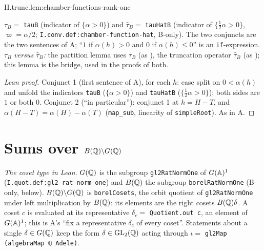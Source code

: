 \begin{lemma}
\end{lemma}
\begin{tfformal}{II.trunc.lem:chamber-functions-rank-one}
\begin{tffidelity}
$\tau_B=$ \texttt{tauB} (indicator of $\{\alpha>0\}$) and $\hat\tau_B=$ \texttt{tauHatB} (indicator of $\{\tfrac12\alpha>0\}$, $\varpi=\alpha/2$; \texttt{I.conv.def:chamber-function-hat}, B-only). The two conjuncts are the two sentences of A; ``$1$ if $\alpha(h)>0$ and $0$ if $\alpha(h)\le0$'' is an \texttt{if}-expression. \emph{$\tau_B$ versus $\hat\tau_B$:} the partition lemma uses $\tau_B$ (as \cite[Lemma~8.2]{AIntro}), the truncation operator $\hat\tau_B$ (as \cite[(13.1)]{AIntro}); this lemma is the bridge, used in the proofs of both.
\end{tffidelity}
\end{tfformal}
\begin{proof}[Lean proof]
Conjunct 1 (first sentence of A), for each $h$: case split on $0<\alpha(h)$ and unfold the indicators \texttt{tauB} ($\{\alpha>0\}$) and \texttt{tauHatB} ($\{\frac12\alpha>0\}$); both sides are $1$ or both $0$. Conjunct 2 (``in particular''): conjunct 1 at $h=H-T$, and $\alpha(H-T)=\alpha(H)-\alpha(T)$ (\texttt{map\_sub}, linearity of \texttt{simpleRoot}). As in A.
\end{proof}


\section{Sums over \texorpdfstring{$B(\mathbb{Q})\backslash G(\mathbb{Q})$}{B(Q)\textbackslash G(Q)}}\label{sec:trunc-cosets}

\noindent\emph{The coset type in Lean}. $G(\mathbb{Q})$ is the subgroup \texttt{gl2RatNormOne} of $G(\mathbb{A})^1$ (\texttt{I.quot.def:gl2-rat-norm-one}) and $B(\mathbb{Q})$ the subgroup \texttt{borelRatNormOne} (B-only, below). $B(\mathbb{Q})\backslash G(\mathbb{Q})$ is \texttt{borelCosets}, the orbit quotient of \texttt{gl2RatNormOne} under left multiplication by $B(\mathbb{Q})$: its elements are the right cosets $B(\mathbb{Q})\delta$. A coset $c$ is evaluated at its representative $\delta_c=$ \texttt{Quotient.out c}, an element of $G(\mathbb{A})^1$; this is A's ``fix a representative $\delta_c$ of every coset''. Statements about a single $\delta\in G(\mathbb{Q})$ keep the form $\delta\in\mathrm{GL}_2(\mathbb{Q})$ acting through $\iota=$ \texttt{gl2Map (algebraMap ℚ Adele)}.

